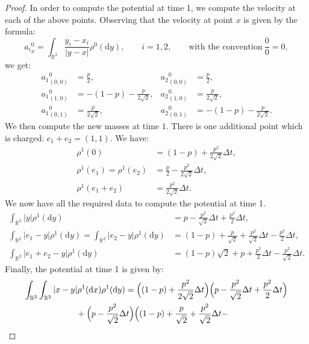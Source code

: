 \documentclass[11pt]{article}
\theoremstyle{definition}
\numberwithin{equation}{section}
\newcommand*{\dd}{\mathrm{d}}
\newcommand*{\dx}{\dd x}
\newcommand*{\dy}{\dd y}
\newcommand*\RR{\mathbb{R}}
\begin{document}
\begin{proof}
In order to compute the potential at time 1, we compute the velocity at each of the above points. Observing that the velocity at point $x$ is given by the formula:
\begin{equation*}
{a_{i}}^0_{x} = \int_{\RR^2} \frac{y_{i} -x_{i} }{\vert y-x \vert}
\rho^0(\dy), \qquad i =1,2,
\qquad \text{with the convention} \ \frac{0}{0} = 0,
\end{equation*}
we get:
\begin{align*}
{a_{1}}^{0}_{(0,0)} &= \frac{p}{2}, & {a_{2}}^{0}_{(0,0)} &= \frac{p}{2},
\\
{a_{1}}^{0}_{(1,0)} &= - (1-p) - \frac{p}{2\sqrt{2}}, & {a_{2}}^{0}_{(1,0)} &= \frac{p}{2\sqrt{2}},
\\
{a_{1}}^{0}_{(0,1)} &= \frac{p}{2\sqrt{2}}, & {a_{2}}^{0}_{(0,1)} &= - (1-p) - \frac{p}{2\sqrt{2}}.
\end{align*}
We then compute the new masses at time $1$. There is one additional point which is charged: $e_{1}+e_{2}=(1,1)$. We have:
\begin{align*}
\rho^{1}(0) &= (1-p) + \frac{p^2}{2\sqrt{2}} \Delta t,
\\
\rho^{1}(e_{1}) = \rho^{1}(e_{2}) &= \frac{p}{2} - \frac{p^2}{2 \sqrt{2}} \Delta t,
\\
\rho^{1}(e_{1}+e_{2}) &= \frac{p^2}{2 \sqrt{2}} \Delta t.
\end{align*}
We now have all the required data to compute the potential at time 1.
\begin{align*}
\int_{\RR^2} \vert y \vert \rho^1(\dy) &= p - \frac{p^2}{\sqrt{2}} \Delta t + \frac{p^2}{2} \Delta t,
\\
\int_{\RR^2} \vert e_{1}- y \vert \rho^1(\dy) =
\int_{\RR^2} \vert e_{2}- y \vert \rho^1(\dy) &= (1-p) + \frac{p}{\sqrt{2}} +
\frac{p^2}{\sqrt{2}} \Delta t -
\frac{p^2}{2} \Delta t,
\\
\int_{\RR^2} \vert e_{1}+e_{2} - y \vert \rho^1(\dy) & = (1-p) \sqrt{2} + p + \frac{p^2}{2} \Delta t - \frac{p^2}{\sqrt{2}} \Delta t.
\end{align*}
Finally, the potential at time 1 is given by:
\begin{multline*}
\int_{\RR^2}\int_{\RR^2} \vert x- y \vert
\rho^{1}(\dx)
\rho^{1}(\dy)= \Bigl((1-p) + \frac{p^2}{2 \sqrt{2}} \Delta t
\Bigr)
\Bigl(p - \frac{p^2}{\sqrt{2}} \Delta t + \frac{p^2}{2} \Delta t \Bigr)
\\
\begin{aligned}
& +\Bigl(p - \frac{p^2}{\sqrt{2}} \Delta t
\Bigr)
\Bigl((1-p) + \frac{p}{\sqrt{2}} +
\frac{p^2}{\sqrt{2}} \Delta t -

\end{aligned}
\end{multline*}
\end{proof}
\end{document}
